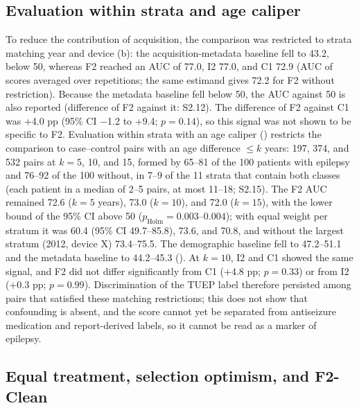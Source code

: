 \subsection{Evaluation within strata and age caliper}\label{sec:strata}

To reduce the contribution of acquisition, the comparison was restricted to strata matching year and device (b): the acquisition-metadata baseline fell to 43.2, below 50, whereas F2 reached an AUC of 77.0, I2 77.0, and C1 72.9 (AUC of scores averaged over repetitions; the same estimand gives 72.2 for F2 without restriction).
Because the metadata baseline fell below 50, the AUC against 50 is also reported (difference of F2 against it: S2.12).
The difference of F2 against C1 was +4.0 pp (95\% CI $-$1.2 to +9.4; $p = 0.14$), so this signal was not shown to be specific to F2.
Evaluation within strata with an age caliper () restricts the comparison to case--control pairs with an age difference $\leq k$ years: 197, 374, and 532 pairs at $k = 5$, 10, and 15, formed by 65--81 of the 100 patients with epilepsy and 76--92 of the 100 without, in 7--9 of the 11 strata that contain both classes (each patient in a median of 2--5 pairs, at most 11--18; S2.15).
The F2 AUC remained 72.6 ($k=5$ years), 73.0 ($k=10$), and 72.0 ($k=15$), with the lower bound of the 95\% CI above 50 ($p_{\mathrm{Holm}} = 0.003$--$0.004$); with equal weight per stratum it was 60.4 (95\% CI 49.7--85.8), 73.6, and 70.8, and without the largest stratum (2012, device X) 73.4--75.5. The demographic baseline fell to 47.2--51.1 and the metadata baseline to 44.2--45.3 (). At $k=10$, I2 and C1 showed the same signal, and F2 did not differ significantly from C1 (+4.8 pp; $p = 0.33$) or from I2 (+0.3 pp; $p = 0.99$).
Discrimination of the TUEP label therefore persisted among pairs that satisfied these matching restrictions; this does not show that confounding is absent, and the score cannot yet be separated from antiseizure medication and report-derived labels, so it cannot be read as a marker of epilepsy.

\subsection{Equal treatment, selection optimism, and F2-Clean}\label{sec:setara}


